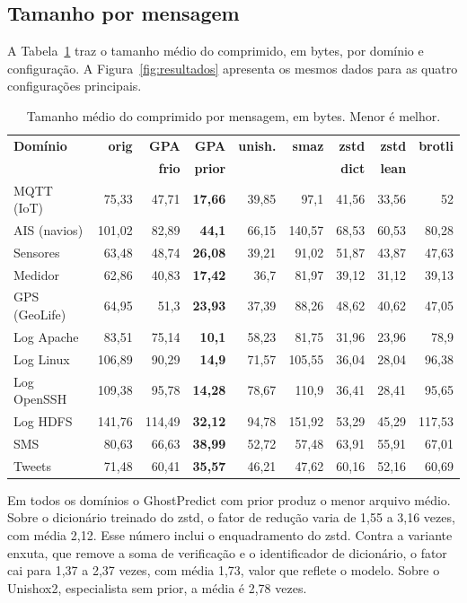 \documentclass[12pt]{article}
\begin{document}
\subsection{Tamanho por mensagem}

A Tabela~\ref{tab:principal} traz o tamanho médio do comprimido, em bytes, por
domínio e configuração. A Figura~\ref{fig:resultados} apresenta os mesmos dados
para as quatro configurações principais.

\begin{table}[ht]
\centering
\caption{Tamanho médio do comprimido por mensagem, em bytes. Menor é melhor.}
\label{tab:principal}
\small
\begin{tabular}{lrrrrrrrr}
\toprule
\textbf{Domínio} & \textbf{orig} & \textbf{GPA} & \textbf{GPA} &
\textbf{unish.} & \textbf{smaz} & \textbf{zstd} & \textbf{zstd} &
\textbf{brotli} \\
 & & \textbf{frio} & \textbf{prior} & & & \textbf{dict} & \textbf{lean} & \\
\midrule
MQTT (IoT) & 75,33 & 47,71 & \textbf{17,66} & 39,85 & 97,1 & 41,56 & 33,56 & 52 \\
AIS (navios) & 101,02 & 82,89 & \textbf{44,1} & 66,15 & 140,57 & 68,53 & 60,53 & 80,28 \\
Sensores & 63,48 & 48,74 & \textbf{26,08} & 39,21 & 91,02 & 51,87 & 43,87 & 47,63 \\
Medidor & 62,86 & 40,83 & \textbf{17,42} & 36,7 & 81,97 & 39,12 & 31,12 & 39,13 \\
GPS (GeoLife) & 64,95 & 51,3 & \textbf{23,93} & 37,39 & 88,26 & 48,62 & 40,62 & 47,05 \\
Log Apache & 83,51 & 75,14 & \textbf{10,1} & 58,23 & 81,75 & 31,96 & 23,96 & 78,9 \\
Log Linux & 106,89 & 90,29 & \textbf{14,9} & 71,57 & 105,55 & 36,04 & 28,04 & 96,38 \\
Log OpenSSH & 109,38 & 95,78 & \textbf{14,28} & 78,67 & 110,9 & 36,41 & 28,41 & 95,65 \\
Log HDFS & 141,76 & 114,49 & \textbf{32,12} & 94,78 & 151,92 & 53,29 & 45,29 & 117,53 \\
SMS & 80,63 & 66,63 & \textbf{38,99} & 52,72 & 57,48 & 63,91 & 55,91 & 67,01 \\
Tweets & 71,48 & 60,41 & \textbf{35,57} & 46,21 & 47,62 & 60,16 & 52,16 & 60,69 \\
\bottomrule
\end{tabular}
\end{table}

Em todos os domínios o GhostPredict com prior produz o menor arquivo médio.
Sobre o dicionário treinado do zstd, o fator de redução varia de 1,55 a 3,16
vezes, com média 2,12. Esse número inclui o enquadramento do zstd. Contra a
variante enxuta, que remove a soma de verificação e o identificador de
dicionário, o fator cai para 1,37 a 2,37 vezes, com média 1,73, valor que
reflete o modelo. Sobre o Unishox2, especialista sem prior, a média é 2,78
vezes.
\end{document}
